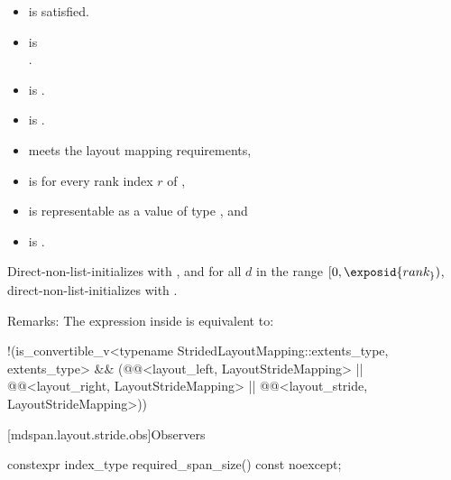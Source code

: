 \begin{itemdescr}
\pnum
\constraints
\begin{itemize}
\item
{} is satisfied.
\item
{} is\\.
\item
{} is .
\item
{} is .
\end{itemize}

\pnum
\expects
\begin{itemize}
\item
{} meets the layout mapping requirements,
\item
{} is 
for every rank index $r$ of ,
\item
{} is representable as
a value of type , and
\item
{} is .
\end{itemize}

\pnum
\effects
Direct-non-list-initializes  with , and
for all $d$ in the range $[0, \exposid{rank_})$,
direct-non-list-initializes 
with .

\pnum
Remarks: The expression inside  is equivalent to:
\begin{codeblock}
!(is_convertible_v<typename StridedLayoutMapping::extents_type, extents_type> &&
  (@@<layout_left, LayoutStrideMapping> ||
   @@<layout_right, LayoutStrideMapping> ||
   @@<layout_stride, LayoutStrideMapping>))
\end{codeblock}
\end{itemdescr}

[mdspan.layout.stride.obs]{Observers}

%
\begin{itemdecl}
constexpr index_type required_span_size() const noexcept;
\end{itemdecl}

